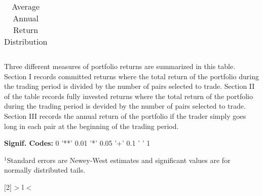 \documentclass[12pt]{article}
\begin{document}
\begin{table}[hp]
\begin{tabular}{l r r l r r r r r r}
        \vspace{-1mm} \\
        \hline
    \end{tabular}
    \caption{Average Annual Return Distribution}
    \begin{tablenotes}
        \item{\footnotesize Three different measures of portfolio returns are summarized in this table. Section I records committed returns where the total return of the portfolio during the trading period is divided by the number of pairs selected to trade. Section II of the table records fully invested returns where the total return of the portfolio during the trading period is devided by the number of pairs selected to trade. Section III records the annual return of the portfolio if the trader simply goes long in each pair at the beginning of the trading period.}
        \item{\footnotesize \textbf{Signif. Codes:} 0 '**' 0.01 '*' 0.05 '+' 0.1 ' ' 1}
        \item{\footnotesize $^{1}$Standard errors are Newey-West estimates and significant values are for normally distributed tails.} 
    \end{tablenotes}
\end{table}


\newcolumntype{R}[2]{%
    >{\bgroup}%
    l%
    <{\egroup}%
}
\newcommand*\rot{\multicolumn{1}{R{30}{1em}}}%
\end{document}
